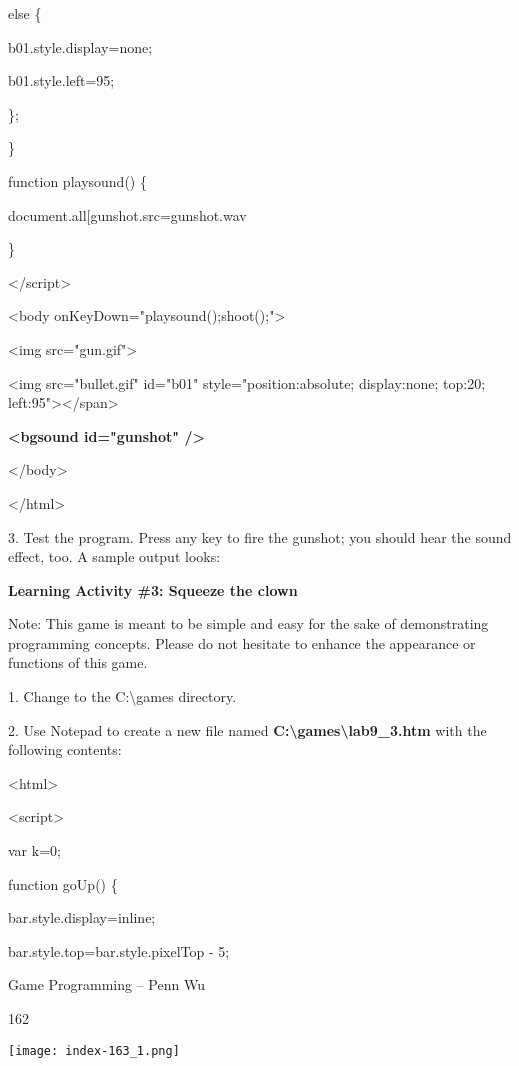 \documentclass[
]{article}
\begin{document}
else \{

b01.style.display=\textquotesingle none\textquotesingle;

b01.style.left=95;

\};

\}

function playsound() \{

document.all{[}\textquotesingle gunshot\textquotesingle{]}.src=\textquotesingle gunshot.wav\textquotesingle{}

\}

\textless/script\textgreater{}

\textless body onKeyDown="playsound();shoot();"\textgreater{}

\textless img src="gun.gif"\textgreater{}

\textless img src="bullet.gif" id="b01" style="position:absolute;
display:none; top:20; left:95"\textgreater\textless/span\textgreater{}

\textbf{\textless bgsound id="gunshot" /\textgreater{}}

\textless/body\textgreater{}

\textless/html\textgreater{}

3. Test the program. Press any key to fire the gunshot; you should hear
the sound effect, too. A sample output looks:

\textbf{Learning Activity \#3: Squeeze the clown}

Note: This game is meant to be simple and easy for the sake of
demonstrating programming concepts. Please do not hesitate to enhance
the appearance or functions of this game.

1. Change to the C:\textbackslash games directory.

2. Use Notepad to create a new file named
\textbf{C:\textbackslash games\textbackslash lab9\_3.htm} with the
following contents:

\textless html\textgreater{}

\textless script\textgreater{}

var k=0;

function goUp() \{

bar.style.display=\textquotesingle inline\textquotesingle;

bar.style.top=bar.style.pixelTop - 5;

Game Programming -- Penn Wu

162

\protect\hypertarget{index_split_010.htmlux5cux23p163}{}{}\texttt{[image: index-163\_1.png]}
\end{document}
